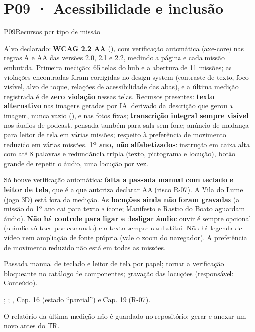 \section{P09 · Acessibilidade e inclusão}
\label{sec:p09}

\begin{resposta}{P09}{Recursos por tipo de missão}{\parcial}
\begin{campos}
  \item[Hoje] Alvo declarado: \textbf{WCAG 2.2 AA} (), com
    verificação automática (axe-core) nas regras A e AA das versões 2.0, 2.1
    e 2.2, medindo a página e cada missão embutida. Primeira medição: 65 telas
    do hub e a abertura de 11 missões; as violações encontradas foram
    corrigidas no design system (contraste de texto, foco visível, alvo de
    toque, relações de acessibilidade das abas), e a última medição
    registrada é de \textbf{zero violação} nessas telas. Recursos presentes:
    \textbf{texto alternativo} nas imagens geradas por IA, derivado da
    descrição que gerou a imagem, nunca vazio (), e nas fotos
    fixas; \textbf{transcrição integral sempre visível} nos áudios de
    podcast, pensada também para sala sem fone; anúncio de mudança para
    leitor de tela em várias missões; respeito à preferência de movimento
    reduzido em várias missões. \textbf{1º ano, não alfabetizados}: instrução
    em caixa alta com até 8 palavras e redundância tripla (texto, pictograma e
    locução), botão grande de repetir o áudio, uma locução por vez.
  \item[Limitações] Só houve verificação automática: \textbf{falta a passada
    manual com teclado e leitor de tela}, que é a que autoriza declarar AA
    (risco R-07). A Vila do Lume (jogo 3D) está fora da medição. As
    \textbf{locuções ainda não foram gravadas} (a missão do 1º ano cai para
    texto e ícone; Manifesto e Rastro do Boato aguardam áudio). \textbf{Não
    há controle para ligar e desligar áudio}: ouvir é sempre opcional (o
    áudio só toca por comando) e o texto sempre o substitui. Não há legenda de
    vídeo nem ampliação de fonte própria (vale o zoom do navegador). A
    preferência de movimento reduzido não está em todas as missões.
  \item[Planejado] Passada manual de teclado e leitor de tela por papel;
    tornar a verificação bloqueante no catálogo de componentes; gravação das
    locuções (responsável: Conteúdo).
  \item[Evidência] ;
    ;
    , Cap. 16 (estado ``parcial'') e Cap. 19 (R-07).
  \item[Lacuna] O relatório da última medição não é guardado no repositório;
    gerar e anexar um novo antes do TR.
\end{campos}
\end{resposta}

